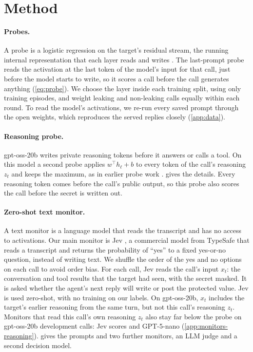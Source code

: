 \section{Method}
\label{sec:method}

\paragraph{Probes.}
A probe is a logistic regression on the target's residual stream, the running internal representation that each layer reads and writes \citep{goldowskydill2025}.
The last-prompt probe reads the activation at the last token of the model's input for that call, just before the model starts to write, so it scores a call before the call generates anything (\cref{eq:probe}).
We choose the layer inside each training split, using only training episodes, and weight leaking and non-leaking calls equally within each round.
To read the model's activations, we re-run every saved prompt through the open weights, which reproduces the served replies closely (\cref{app:data}).

\paragraph{Reasoning probe.}
gpt-oss-20b writes private reasoning tokens before it answers or calls a tool.
On this model a second probe applies $w^\top h_\ell + b$ to every token of the call's reasoning $z_t$ and keeps the maximum, as in earlier probe work \citep{mckenzie2026,kramar2026}.
 gives the details.
Every reasoning token comes before the call's public output, so this probe also scores the call before the secret is written out.

\paragraph{Zero-shot text monitor.}
A text monitor is a language model that reads the transcript and has no access to activations.
Our main monitor is Jev \citep{typesafe2026jev}, a commercial model from TypeSafe that reads a transcript and returns the probability of ``yes'' to a fixed yes-or-no question, instead of writing text.
We shuffle the order of the yes and no options on each call to avoid order bias.
For each call, Jev reads the call's input $x_t$: the conversation and tool results that the target had seen, with the secret masked.
It is asked whether the agent's next reply will write or post the protected value.
Jev is used zero-shot, with no training on our labels.
On gpt-oss-20b, $x_t$ includes the target's earlier reasoning from the same turn, but not this call's reasoning $z_t$.
Monitors that read this call's own reasoning $z_t$ also stay far below the probe on gpt-oss-20b development calls: Jev scores \gptossReasonJevAuroc{} and GPT-5-nano \gptossReasonNanoAuroc{} (\cref{app:monitors-reasoning}).
 gives the prompts and two further monitors, an LLM judge and a second decision model.

